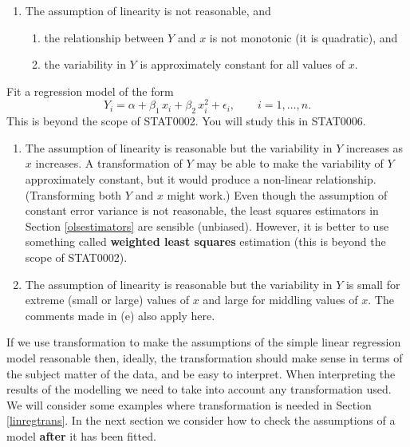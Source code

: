 \documentclass[
  british,
  11pt,
  openany, a4paper]{book}
\providecommand{\tightlist}{%
  \setlength{\itemsep}{0pt}\setlength{\parskip}{0pt}}
\begin{document}
\begin{enumerate}
\def\labelenumi{\alph{enumi}.}
\setcounter{enumi}{3}
\tightlist
\item
  The assumption of linearity is not reasonable, and

  \begin{enumerate}
  \def\labelenumii{\roman{enumii}.}
  \tightlist
  \item
    the relationship between \(Y\) and \(x\) is not monotonic (it is quadratic), and
  \item
    the variability in \(Y\) is approximately constant for all values of \(x\).
  \end{enumerate}
\end{enumerate}

Fit a regression model of the form
\[ Y_i = \alpha+\beta_1\,x_i+\beta_2\,x_i^2 + \epsilon_i, \qquad i=1,\ldots, n. \]
This is beyond the scope of STAT0002. You will study this in STAT0006.

\begin{enumerate}
\def\labelenumi{\alph{enumi}.}
\setcounter{enumi}{4}
\item
  The assumption of linearity is reasonable but the variability in \(Y\) increases as \(x\) increases. A transformation of \(Y\) may be able to make the variability of \(Y\) approximately constant, but it would produce a non-linear relationship. (Transforming both \(Y\) and \(x\) might work.) Even though the assumption of constant error variance is not reasonable, the least squares estimators in Section \ref{olsestimators} are sensible (unbiased). However, it is better to use something called \textbf{weighted least squares} estimation (this is beyond the scope
  of STAT0002).
\item
  The assumption of linearity is reasonable but the variability in \(Y\) is small for extreme (small or large) values of \(x\) and large for middling values of \(x\). The comments made in (e) also apply here.
\end{enumerate}

If we use transformation to make the assumptions of the simple linear regression model reasonable then, ideally, the transformation should make sense in terms of the subject matter of the data, and be easy to interpret. When interpreting the results of the modelling we need to take into account any transformation used. We will consider some examples where transformation is needed in Section \ref{linregtrans}. In the next section we consider how to check the assumptions of a model \textbf{after} it has been fitted.
\end{document}
